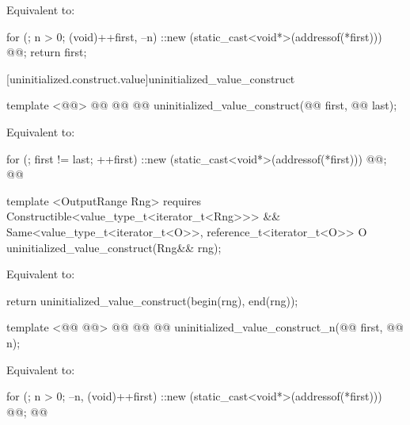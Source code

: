 \pnum
\effects Equivalent to:
\begin{codeblock}
        for (; n > 0; (void)++first, --n)
          ::new (static_cast<void*>(addressof(*first)))
            @@;
        return first;
\end{codeblock}

[uninitialized.construct.value]{uninitialized_value_construct}
\begin{codeblock}
  template <@@>
    @@
             @@
    @@ uninitialized_value_construct(@@ first, @@ last);
\end{codeblock}


\setcounter{Paras}{0}
\effects Equivalent to:
\begin{codeblock}
        for (; first != last; ++first)
          ::new (static_cast<void*>(addressof(*first)))
            @@;
        @@
\end{codeblock}
{\color{newclr}
\begin{codeblock}
  template <OutputRange Rng>
    requires Constructible<value_type_t<iterator_t<Rng>>> &&
             Same<value_type_t<iterator_t<O>>, reference_t<iterator_t<O>>
  O uninitialized_value_construct(Rng&& rng);
\end{codeblock}

\pnum
\effects Equivalent to:
\begin{codeblock}
      return uninitialized_value_construct(begin(rng), end(rng));
\end{codeblock}
} %

\begin{codeblock}
  template <@@ @@>
    @@
             @@
  @@
    uninitialized_value_construct_n(@@ first, @@ n);
\end{codeblock}

\pnum
\effects Equivalent to:
\begin{codeblock}
        for (; n > 0; --n, (void)++first)
          ::new (static_cast<void*>(addressof(*first)))
            @@;
        @@
\end{codeblock}

